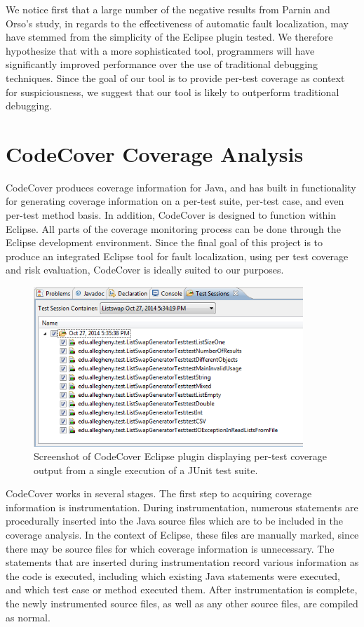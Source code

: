 We notice first that a large number of the negative results from Parnin and Orso's
study, in regards to the effectiveness of automatic fault localization, may have
stemmed from the simplicity of the Eclipse plugin tested.  We therefore hypothesize
that with a more sophisticated tool, programmers will have significantly improved
performance over the use of traditional debugging techniques.  Since the goal of our
tool is to provide per-test coverage as context for suspiciousness, we suggest that
our tool is likely to outperform traditional debugging.

\section{CodeCover Coverage Analysis}\label{sec:cover}
CodeCover produces coverage information for Java, and has built in 
functionality for generating coverage information on a per-test suite,
per-test case, and even per-test method basis.  In addition, CodeCover
is designed to function within Eclipse.  All parts of the coverage
monitoring process can be done through the Eclipse development
environment.  Since the final goal of this project is to produce an
integrated Eclipse tool for fault localization, using per test
coverage and risk evaluation, CodeCover is ideally suited to our
purposes.  

\begin{figure}[htpb]
  \centering
  \includegraphics[width=4in]{img/codecoverpertest.png}
  \caption{Screenshot of CodeCover Eclipse plugin displaying per-test coverage
  output from a single execution of a JUnit test suite.}
  \label{codecover}
\end{figure}

CodeCover works in several stages.  The first step to acquiring coverage
information is instrumentation.  During instrumentation, numerous
statements are procedurally inserted into the Java source files which 
are to be included in the coverage analysis.  In the context of Eclipse,
these files are manually marked, since there may be source files for 
which coverage information is unnecessary.  The statements that are 
inserted during instrumentation record various information as the code
is executed, including which existing Java statements were executed, and
which test case or method executed them.  After instrumentation is
complete, the newly instrumented source files, as well as any other source
files, are compiled as normal.

